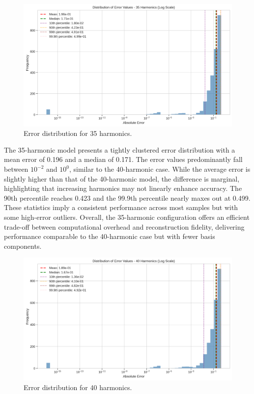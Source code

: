 \documentclass[preprint,12pt]{elsarticle}
\begin{document}
\begin{figure}[t]
    \centering
    \includegraphics[width=0.9\linewidth]{figures/error_distribution_35h.png}
    \caption{Error distribution for 35 harmonics.}
    \label{fig:error_35h}
\end{figure}

The 35-harmonic model presents a tightly clustered error distribution with a mean error of 0.196 and a median of 0.171. The error values predominantly fall between \(10^{-2}\) and \(10^{0}\), similar to the 40-harmonic case. While the average error is slightly higher than that of the 40-harmonic model, the difference is marginal, highlighting that increasing harmonics may not linearly enhance accuracy. The 90th percentile reaches 0.423 and the 99.9th percentile nearly maxes out at 0.499. These statistics imply a consistent performance across most samples but with some high-error outliers. Overall, the 35-harmonic configuration offers an efficient trade-off between computational overhead and reconstruction fidelity, delivering performance comparable to the 40-harmonic case but with fewer basis components.

\begin{figure}[t]
    \centering
    \includegraphics[width=0.9\linewidth]{figures/error_distribution_40h.png}
    \caption{Error distribution for 40 harmonics.}
    \label{fig:error_40h}
\end{figure}
\end{document}
